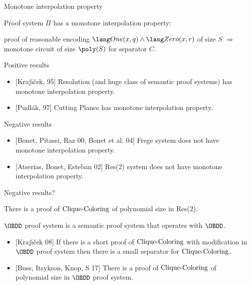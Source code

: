 \begin{frame}{Monotone interpolation property}

    Proof system $\Pi$ has a monotone interpolation property:
    
    proof of reasonable encoding $\One(x, q) \land \Zero(x, r)$ of size $S$ $\Rightarrow$ monotone circuit
    of size $\poly(S)$ for separator $C$.

    \pause
    \begin{block}{Positive results}
        \begin{itemize}
            \item {[Kraj{\'{\i}}{\v{c}}ek, 95]} Resolution (and huge class of semantic proof systems) has
                monotone interpolation property.
            \item {[Pudl{\'{a}}k, 97]} Cutting Planes has monotone interpolation property.
        \end{itemize}
    \end{block}

    \pause
    \begin{block}{Negative results}
        \begin{itemize}
            \item {[Bonet, Pitassi, Raz 00, Bonet et al. 04]} Frege system does not have monotone interpolation
                property.
            \item {[Atserias, Bonet, Esteban 02]} Res(2) system does not have monotone interpolation
                property.
        \end{itemize}
    \end{block}
    
\end{frame}

\begin{frame}{Negative results?}

    \begin{theorem}
        There is a proof of $\mathrm{Clique}\text{-}\mathrm{Coloring}$ of polynomial size in Res(2).
    \end{theorem}

    \pause
    $\OBDD$ proof system is a semantic proof system that operates with $\OBDD$.

    \begin{itemize}
        \item {[Kraj{\'{\i}}{\v{c}}ek 08]} If there is a short proof of $\mathrm{Clique}\text{-}\mathrm{Coloring}$ {\color{blue}
            with modification} in $\OBDD$ proof system then there is a small separator for
            $\mathrm{Clique}\text{-}\mathrm{Coloring}$.
        \item {[Buss, Itsykson, Knop, S 17]} There is a proof of $\mathrm{Clique}\text{-}\mathrm{Coloring}$ of polynomial size in
            $\OBDD$ proof system.
    \end{itemize}
\end{frame}

